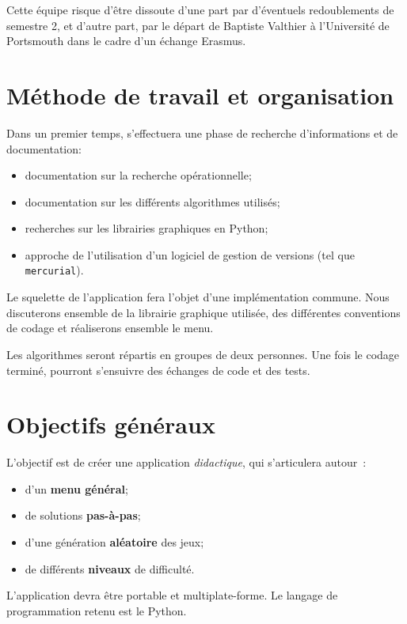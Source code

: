 \documentclass[12pt]{report}
\begin{document}
  Cette équipe risque d'être dissoute d'une part par d'éventuels redoublements
   de semestre 2, et d'autre part, par le départ de Baptiste Valthier à
   l'Université de Portsmouth dans le cadre d'un échange Erasmus.
  
  \section{Méthode de travail et organisation}
  
  Dans un premier temps, s'effectuera une phase de recherche d'informations
   et de documentation:
  
  \begin{itemize}
  	\item documentation sur la recherche opérationnelle;
  	\item documentation sur les différents algorithmes utilisés;
  	\item recherches sur les librairies graphiques en Python;
  	\item approche de l'utilisation d'un logiciel de gestion de versions
  	 (tel que {\tt mercurial}).
  \end{itemize}
  
  Le squelette de l'application fera l'objet d'une implémentation commune.
   Nous discuterons ensemble de la librairie graphique utilisée, des différentes
   conventions de codage et réaliserons ensemble le menu.
  
  Les algorithmes seront répartis en groupes de deux personnes. Une fois
   le codage terminé, pourront s'ensuivre des échanges de code et des tests.
  
  \section{Objectifs généraux}
  
  L'objectif est de créer une application \emph{didactique}, qui s'articulera
   autour~:
  
  \begin{itemize}
  	\item d'un {\bf menu général};
  	\item de solutions {\bf pas-à-pas};
  	\item d'une génération {\bf aléatoire} des jeux;
  	\item de différents {\bf niveaux} de difficulté.
  \end{itemize}
  
  L'application devra être portable et multiplate-forme. Le langage de
   programmation retenu est le Python.
\end{document}
